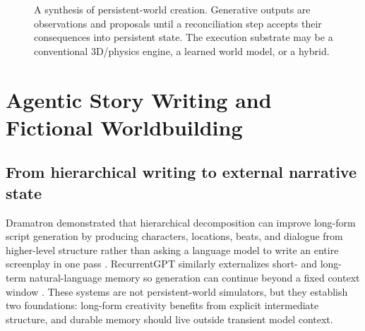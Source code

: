 \documentclass{article}
\begin{document}
\begin{figure}[t]
\centering
{}
\caption{A synthesis of persistent-world creation. Generative outputs are observations and proposals until a reconciliation step accepts their consequences into persistent state. The execution substrate may be a conventional 3D/physics engine, a learned world model, or a hybrid.}
\label{fig:synthesis}
\end{figure}

\section{Agentic Story Writing and Fictional Worldbuilding}

\subsection{From hierarchical writing to external narrative state}

Dramatron demonstrated that hierarchical decomposition can improve long-form script generation by producing characters, locations, beats, and dialogue from higher-level structure rather than asking a language model to write an entire screenplay in one pass \citep{mirowski2022dramatron}. RecurrentGPT similarly externalizes short- and long-term natural-language memory so generation can continue beyond a fixed context window \citep{zhou2023recurrentgpt}. These systems are not persistent-world simulators, but they establish two foundations: long-form creativity benefits from explicit intermediate structure, and durable memory should live outside transient model context.
\end{document}

